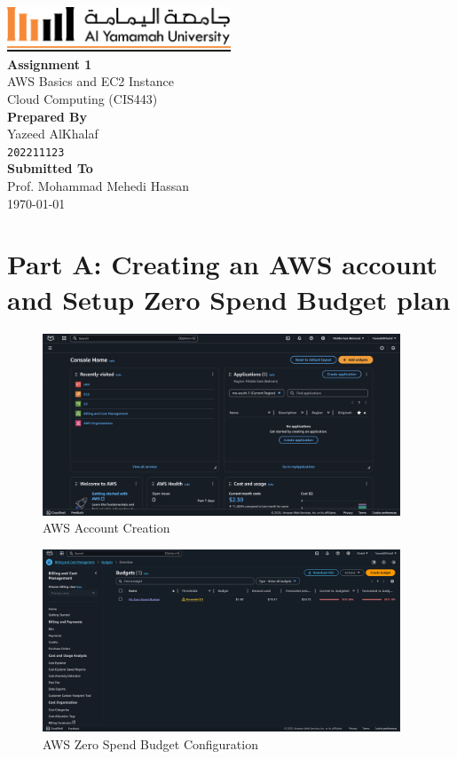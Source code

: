 \documentclass[a4paper,12pt]{article}
\def\maketitle{
  \begin{titlepage}
    \centering
    \vspace*{-1cm}
    \includegraphics[width=0.5\textwidth]{yu-logo.png}\\[2cm]
    
    {\huge\bfseries Assignment 1\\}
    \vspace{0.5cm}
    {\Large AWS Basics and EC2 Instance}\\[1.5cm]
    
    {\large Cloud Computing (CIS443)}\\[3cm]
    
    {\large\bfseries Prepared By}\\[0.3cm]
    {\Large Yazeed AlKhalaf}\\
    {\texttt{202211123}}\\[2cm]
    
    {\large\bfseries Submitted To}\\[0.3cm]
    {\Large Prof. Mohammad Mehedi Hassan}\\[2cm]
    
    {\large \today}
    
    \vfill
  \end{titlepage}
}
\begin{document}
\maketitle

\thispagestyle{fancy}
\tableofcontents
\newpage

\thispagestyle{fancy}
\listoffigures
\newpage

\setcounter{page}{1}

\section{Part A: Creating an AWS account and Setup Zero Spend Budget plan}

\begin{figure}[H]
    \centering
    \includegraphics[width=0.95\textwidth]{aws-account.png}
    \caption{AWS Account Creation}
    \label{fig:aws-account}
\end{figure}

\begin{figure}[H]
    \centering
    \includegraphics[width=0.95\textwidth]{setup-zero-spend-budget.png}
    \caption{AWS Zero Spend Budget Configuration}
    \label{fig:aws-zero-spend-budget-config}
\end{figure}
\end{document}
